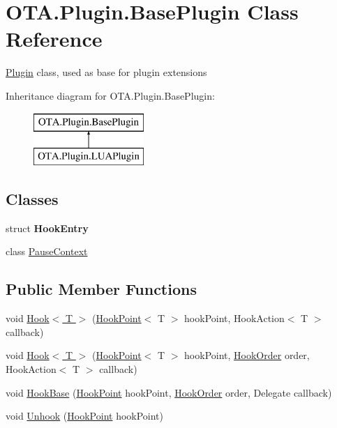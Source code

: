 \hypertarget{class_o_t_a_1_1_plugin_1_1_base_plugin}{}\section{O\+T\+A.\+Plugin.\+Base\+Plugin Class Reference}
\label{class_o_t_a_1_1_plugin_1_1_base_plugin}


\hyperlink{namespace_o_t_a_1_1_plugin}{Plugin} class, used as base for plugin extensions  


Inheritance diagram for O\+T\+A.\+Plugin.\+Base\+Plugin\+:\begin{figure}[H]
\begin{center}
\leavevmode
\includegraphics[height=2.000000cm]{class_o_t_a_1_1_plugin_1_1_base_plugin}
\end{center}
\end{figure}
\subsection*{Classes}
\begin{DoxyCompactItemize}
\item 
struct {\bfseries Hook\+Entry}
\item 
class \hyperlink{class_o_t_a_1_1_plugin_1_1_base_plugin_1_1_pause_context}{Pause\+Context}
\end{DoxyCompactItemize}
\subsection*{Public Member Functions}
\begin{DoxyCompactItemize}
\item 
void \hyperlink{class_o_t_a_1_1_plugin_1_1_base_plugin_a488e2cb2e85b48f177c1e1be17516d1f}{Hook$<$ T $>$} (\hyperlink{class_o_t_a_1_1_plugin_1_1_hook_point}{Hook\+Point}$<$ T $>$ hook\+Point, Hook\+Action$<$ T $>$ callback)
\item 
void \hyperlink{class_o_t_a_1_1_plugin_1_1_base_plugin_ac30df5bd732247fa90a7614f73c93896}{Hook$<$ T $>$} (\hyperlink{class_o_t_a_1_1_plugin_1_1_hook_point}{Hook\+Point}$<$ T $>$ hook\+Point, \hyperlink{namespace_o_t_a_1_1_plugin_a1030f4a1f490e336a706685a767f6874}{Hook\+Order} order, Hook\+Action$<$ T $>$ callback)
\item 
void \hyperlink{class_o_t_a_1_1_plugin_1_1_base_plugin_a645013bb3f3a37f97d7a97e3e8813828}{Hook\+Base} (\hyperlink{class_o_t_a_1_1_plugin_1_1_hook_point}{Hook\+Point} hook\+Point, \hyperlink{namespace_o_t_a_1_1_plugin_a1030f4a1f490e336a706685a767f6874}{Hook\+Order} order, Delegate callback)
\item 
void \hyperlink{class_o_t_a_1_1_plugin_1_1_base_plugin_ad5bb188d79483d8e840a6b376d2e5f79}{Unhook} (\hyperlink{class_o_t_a_1_1_plugin_1_1_hook_point}{Hook\+Point} hook\+Point)
\end{DoxyCompactItemize}
